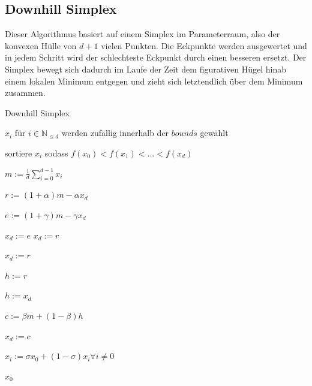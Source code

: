 \documentclass[a4paper,12pt]{article}
\begin{document}





\subsection{Downhill Simplex \cite{nelder_mead_1965} }

Dieser Algorithmus basiert auf einem Simplex im Parameterraum, also der konvexen Hülle von $d+1$ vielen Punkten. Die Eckpunkte werden ausgewertet und in jedem Schritt wird der schlechteste Eckpunkt durch einen besseren ersetzt. Der Simplex bewegt sich dadurch im Laufe der Zeit dem figurativen Hügel hinab einem lokalen Minimum entgegen und zieht sich letztendlich über dem Minimum zusammen.

\begin{algorithm}
\caption{Downhill Simplex}
\begin{algorithmic}

\State $x_i$ für $i \in \mathbb{N}_{\leq d}$ werden zufällig innerhalb der $bounds$ gewählt


\State sortiere $x_i$ sodass $f(x_0) < f(x_1) < \hdots < f(x_d)$

\State $m := \frac{1}{d} \sum^{d-1}_{i = 0} x_i$ 

\State $r := (1+\alpha)m - \alpha x_d$ 


\State $e := (1+\gamma)m - \gamma x_d$ 

\State $x_d := e$
\Else
\State $x_d := r$
\EndIf

\State $x_d := r$
\Else

\State $h := r$

\Else
\State $h := x_d$

\EndIf

\State $c := \beta m  + (1-\beta) h$


\State $x_d := c$ 

\Else

\State $x_i := \sigma x_0 + (1-\sigma) x_i \forall i \neq 0$ 

\EndIf

\EndIf

\EndFor

\Return $x_0$
\EndFunction	
\end{algorithmic}
\end{algorithm}
\end{document}
